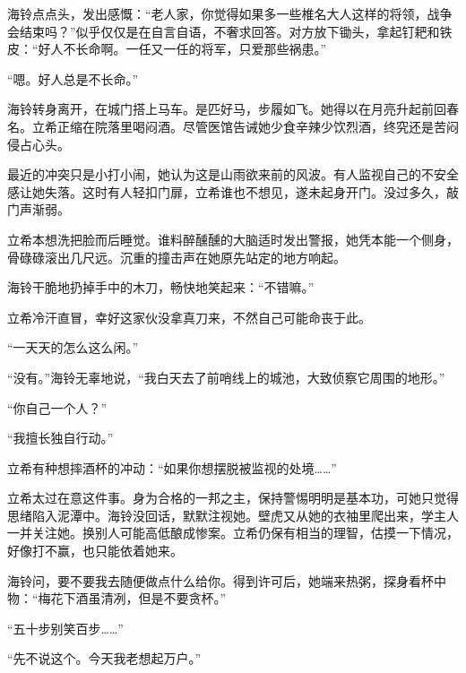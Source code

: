 \documentclass{article}
\begin{document}
海铃点点头，发出感慨：“老人家，你觉得如果多一些椎名大人这样的将领，战争会结束吗？”似乎仅仅是在自言自语，不奢求回答。对方放下锄头，拿起钉耙和铁皮：“好人不长命啊。一任又一任的将军，只爱那些祸患。”



“嗯。好人总是不长命。”



海铃转身离开，在城门搭上马车。是匹好马，步履如飞。她得以在月亮升起前回春名。立希正缩在院落里喝闷酒。尽管医馆告诫她少食辛辣少饮烈酒，终究还是苦闷侵占心头。



最近的冲突只是小打小闹，她认为这是山雨欲来前的风波。有人监视自己的不安全感让她失落。这时有人轻扣门扉，立希谁也不想见，遂未起身开门。没过多久，敲门声渐弱。



立希本想洗把脸而后睡觉。谁料醉醺醺的大脑适时发出警报，她凭本能一个侧身，骨碌碌滚出几尺远。沉重的撞击声在她原先站定的地方响起。



海铃干脆地扔掉手中的木刀，畅快地笑起来：“不错嘛。”



立希冷汗直冒，幸好这家伙没拿真刀来，不然自己可能命丧于此。



“一天天的怎么这么闲。”



“没有。”海铃无辜地说，“我白天去了前哨线上的城池，大致侦察它周围的地形。”



“你自己一个人？”



“我擅长独自行动。”



立希有种想摔酒杯的冲动：“如果你想摆脱被监视的处境……”



立希太过在意这件事。身为合格的一邦之主，保持警惕明明是基本功，可她只觉得思绪陷入泥潭中。海铃没回话，默默注视她。壁虎又从她的衣袖里爬出来，学主人一并关注她。换别人可能高低酿成惨案。立希仍保有相当的理智，估摸一下情况，好像打不赢，也只能依着她来。



海铃问，要不要我去随便做点什么给你。得到许可后，她端来热粥，探身看杯中物：“梅花下酒虽清冽，但是不要贪杯。”



“五十步别笑百步……”



“先不说这个。今天我老想起万户。”
\end{document}
